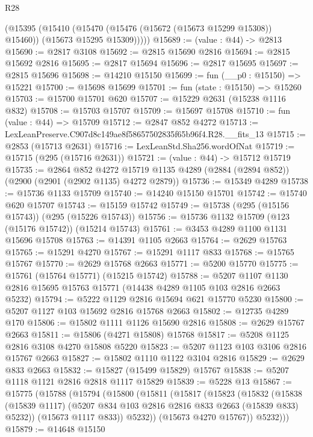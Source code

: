 \begin{lexlean}{R28}
\begin{coremodule}
        (@15395
          (@15410
            (@15470 (@15476 (@15672 (@15673 @15299 @15308)) @15460))
            (@15673 @15295 @15309)))))
@15689 := (value : @44) -> @2813
@15690 := @2817 @3108
@15692 := @2815 @15690 @2816
@15694 := @2815 @15692 @2816
@15695 := @2817 @15694
@15696 := @2817 @15695
@15697 := @2815 @15696
@15698 := @14210 @15150
@15699 := fun (__p0 : @15150) => @15221
@15700 := @15698 @15699
@15701 := fun (state : @15150) => @15260
@15703 := @15700 @15701 @620
@15707 := @15229 @2631 (@15238 @1116 @832)
@15708 := @15703 @15707
@15709 := @15697 @15708
@15710 := fun (value : @44) => @15709
@15712 := @2847 @852 @4272
@15713 := LexLeanPreserve.C907d8c149ae8f58657502835f65b96f4.R28.__fits_13
@15715 := @2853 (@15713 @2631)
@15716 := LexLeanStd.Sha256.wordOfNat
@15719 := @15715 (@295 (@15716 @2631))
@15721 := (value : @44) -> @15712 @15719
@15735 := @2864
    @852
    @4272
    @15719
    @1135
    @4289
    (@2884 (@2894 @852))
    (@2900 (@2901 (@2902 @1135) @4272 @2879))
@15736 := @15349 @4289
@15738 := @15736 @1133 @15709
@15740 := @14240 @15150 @15701
@15742 := @15740 @620 @15707
@15743 := @15159 @15742
@15749 := @15738 (@295 (@15156 @15743)) (@295 (@15226 @15743))
@15756 := @15736 @1132 @15709 (@123 (@15176 @15742)) (@15214 @15743)
@15761 := @3453 @4289 @1100 @1131 @15696 @15708
@15763 := @14391 @1105 @2663
@15764 := @2629 @15763
@15765 := @15291 @4270
@15767 := @15291 @1117 @833
@15768 := @15765 @15767
@15770 := @2629 @15768 @2663
@15771 := @5200 @15770
@15775 := @15761 (@15764 @15771) (@15215 @15742)
@15788 := @5207 @1107 @1130 @2816 @15695 @15763 @15771 (@14438 @4289 @1105 @103 @2816 @2663 @5232)
@15794 := @5222 @1129 @2816 @15694 @621 @15770 @5230
@15800 := @5207 @1127 @103 @15692 @2816 @15768 @2663
@15802 := @12735 @4289 @170
@15806 := @15802 @1111 @1126 @15690 @2816
@15808 := @2629 @15767 @2663
@15811 := @15806 (@4271 @15808) @15768
@15817 := @5208 @1125 @2816 @3108 @4270 @15808 @5220
@15823 := @5207 @1123 @103 @3106 @2816 @15767 @2663
@15827 := @15802 @1110 @1122 @3104 @2816
@15829 := @2629 @833 @2663
@15832 := @15827 (@15499 @15829) @15767
@15838 := @5207 @1118 @1121 @2816 @2818 @1117 @15829
@15839 := @5228 @13
@15867 := @15775
    (@15788
      (@15794
        (@15800
          (@15811
            (@15817
              (@15823
                (@15832
                  (@15838
                    (@15839 @1117)
                    (@5207 @834 @103 @2816 @2816 @833 @2663 (@15839 @833) @5232))
                  (@15673 @1117 @833))
                @5232))
            (@15673 @4270 @15767))
          @5232)))
@15879 := @14648
    @15150

\end{coremodule}
\end{lexlean}
